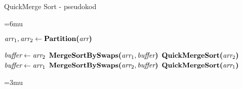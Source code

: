\begin{frame}[squeeze]{QuickMerge Sort - pseudokod}
	
	\begin{algorithm}[H]
		\unboldmath
		\thinmuskip=6mu
		\begin{algorithmic}[1]
			
			\State
			  
			\EndIf
			
			\State
			\State $\textit{arr}_1, \textit{arr}_2 \gets \textbf{Partition(}\textit{arr}\textbf{)}$ 
			
			\State
			 
			\State $\textit{buffer} \gets \textit{arr}_2$
			\State $\textbf{MergeSortBySwaps(}\textit{arr}_1, \textit{buffer}\textbf{)}$
			\State $\textbf{QuickMergeSort(}\textit{arr}_2\textbf{)}$
			\Else
			\State $\textit{buffer} \gets \textit{arr}_1$
			\State $\textbf{MergeSortBySwaps(}\textit{arr}_2, \textit{buffer}\textbf{)}$
			\State $\textbf{QuickMergeSort(}\textit{arr}_1\textbf{)}$
			\EndIf

			\EndProcedure
		\end{algorithmic}
		\boldmath
		\thinmuskip=3mu
	\end{algorithm}
	
\end{frame}